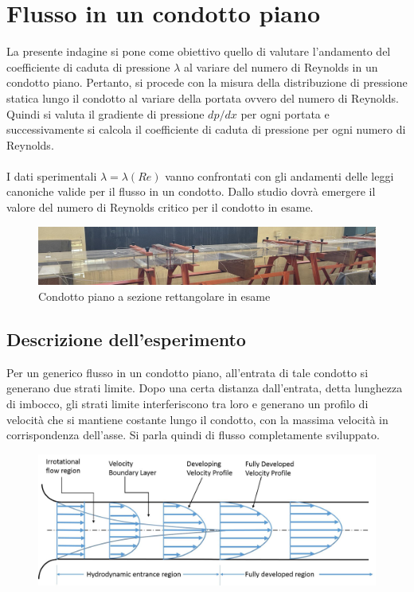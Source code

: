 \section{Flusso in un condotto piano}
La presente indagine si pone come obiettivo quello di valutare l'andamento del coefficiente di caduta di pressione $\lambda$ al variare del numero di Reynolds in un condotto piano. Pertanto, si procede con la misura della distribuzione di pressione statica lungo il condotto al variare della portata ovvero del numero di Reynolds. Quindi si valuta il gradiente di pressione $dp/dx$ per ogni portata e successivamente si calcola il coefficiente di caduta di pressione per ogni numero di Reynolds.\\\\
I dati sperimentali $\lambda=\lambda(Re)$ vanno confrontati con gli andamenti delle leggi canoniche valide per il flusso in un condotto. Dallo studio dovrà emergere il valore del numero di Reynolds critico per il condotto in esame.
\begin{figure}[H]
    \centering
    \includegraphics[width=\textwidth]{images/7/condotto.jpg}
    \caption{Condotto piano a sezione rettangolare in esame}
\end{figure}

\subsection{Descrizione dell'esperimento}
Per un generico flusso in un condotto piano, all'entrata di tale condotto si generano due strati limite. Dopo una certa distanza dall'entrata, detta lunghezza di imbocco, gli strati limite interferiscono tra loro e generano un profilo di velocità che si mantiene costante lungo il condotto, con la massima velocità in corrispondenza dell'asse. Si parla quindi di flusso completamente sviluppato.
\begin{figure}[h]
    \centering
    \includegraphics[width=\textwidth]{images/7/fullydeveloped.jpg}
\end{figure}

